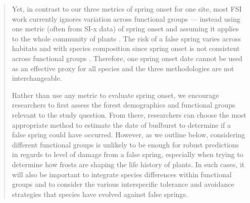 \documentclass[11pt,a4paper]{article}
\begin{document}
\begin{quotation}
Yet, in contrast to our three metrics of spring onset for one site, most FSI work currently ignores variation across functional groups --- instead using one metric (often from SI-x data) of spring onset and assuming it applies to the whole community of plants \citep{Allstadt2015, Marino2011, Mehdipoor2017, Peterson2014}. The risk of a false spring varies across habitats and with species composition since spring onset is not consistent across functional groups \citep{Martin2010}. Therefore, one spring onset date cannot be used as an effective proxy for all species and the three methodologies are not interchangeable. 

Rather than use any metric to evaluate spring onset, we encourage researchers to first assess the forest demographics and functional groups relevant to the study question. From there, researchers can choose the most appropriate method to estimate the date of budburst to determine if a false spring could have occurred. However, as we outline below, considering different functional groups is unlikely to be enough for robust predictions in regards to level of damage from a false spring, especially when trying to determine how frosts are shaping the life history of plants. In such cases, it will also be important to integrate species differences within functional groups and to consider the various interspecific tolerance and avoidance strategies that species have evolved against false springs. 
\end{quotation}




\newpage

\end{document}
